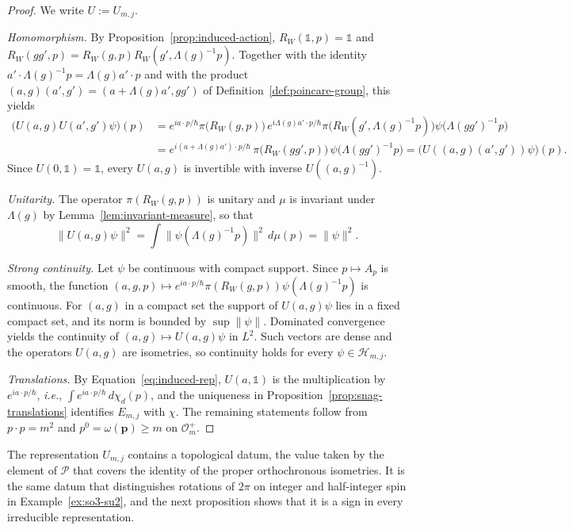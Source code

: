 \begin{proof}
	We write $U:=U_{m,j}$.
	
	\emph{Homomorphism.} By Proposition~\ref{prop:induced-action}, $R_W(\mathbb{1},p)=\mathbb{1}$ and $R_W(gg',p)=R_W(g,p)R_W(g',\Lambda(g)^{-1}p)$. Together with the identity $a'\cdot\Lambda(g)^{-1}p=\Lambda(g)a'\cdot p$ and with the product $(a,g)(a',g')=(a+\Lambda(g)a',gg')$ of Definition~\ref{def:poincare-group}, this yields
	\begin{align*}
		\big(U(a,g)U(a',g')\psi\big)(p)&=e^{ia\cdot p/\hbar}\pi\big(R_W(g,p)\big)\,e^{i\Lambda(g)a'\cdot p/\hbar}\pi\big(R_W(g',\Lambda(g)^{-1}p)\big)\psi\big(\Lambda(gg')^{-1}p\big)\\
		&=e^{i(a+\Lambda(g)a')\cdot p/\hbar}\,\pi\big(R_W(gg',p)\big)\,\psi\big(\Lambda(gg')^{-1}p\big)=\big(U((a,g)(a',g'))\psi\big)(p).
	\end{align*}
	Since $U(0,\mathbb{1})=\mathbb{1}$, every $U(a,g)$ is invertible with inverse $U((a,g)^{-1})$.
	
	\emph{Unitarity.} The operator $\pi(R_W(g,p))$ is unitary and $\mu$ is invariant under $\Lambda(g)$ by Lemma~\ref{lem:invariant-measure}, so that
	\begin{equation*}
		\|U(a,g)\psi\|^2=\int\|\psi(\Lambda(g)^{-1}p)\|^2\,d\mu(p)=\|\psi\|^2.
	\end{equation*}
	
	\emph{Strong continuity.} Let $\psi$ be continuous with compact support. Since $p\mapsto A_p$ is smooth, the function $(a,g,p)\mapsto e^{ia\cdot p/\hbar}\pi(R_W(g,p))\psi(\Lambda(g)^{-1}p)$ is continuous. For $(a,g)$ in a compact set the support of $U(a,g)\psi$ lies in a fixed compact set, and its norm is bounded by $\sup\|\psi\|$. Dominated convergence yields the continuity of $(a,g)\mapsto U(a,g)\psi$ in $L^2$. Such vectors are dense and the operators $U(a,g)$ are isometries, so continuity holds for every $\psi\in\mathcal{H}_{m,j}$.
	
	\emph{Translations.} By Equation~\eqref{eq:induced-rep}, $U(a,\mathbb{1})$ is the multiplication by $e^{ia\cdot p/\hbar}$, \textit{i.e.}, $\int e^{ia\cdot p/\hbar}\,d\chi_d(p)$, and the uniqueness in Proposition~\ref{prop:snag-translations} identifies $E_{m,j}$ with $\chi$. The remaining statements follow from $p\cdot p=m^2$ and $p^0=\omega(\mathbf{p})\geq m$ on $\mathcal{O}_m^+$.
\end{proof}

The representation $U_{m,j}$ contains a topological datum, the value taken by the element of $\mathcal{P}$ that covers the identity of the proper orthochronous isometries. It is the same datum that distinguishes rotations of $2\pi$ on integer and half-integer spin in Example~\ref{ex:so3-su2}, and the next proposition shows that it is a sign in every irreducible representation.

